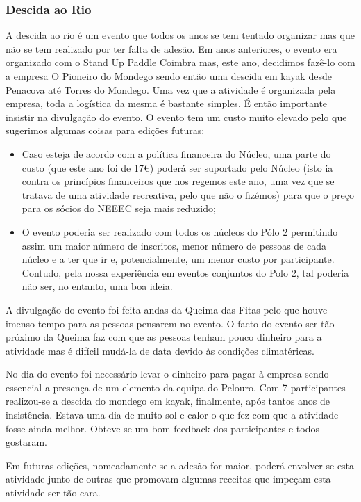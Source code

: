 
\subsubsection{Descida ao Rio}

A descida ao rio é um evento que todos os anos se tem tentado organizar mas que não se tem realizado por ter falta de adesão. Em anos anteriores, o evento era organizado com o Stand Up Paddle Coimbra mas, este ano, decidimos fazê-lo com a empresa O Pioneiro do Mondego sendo então uma descida em kayak desde Penacova até Torres do Mondego. Uma vez que a atividade é organizada pela empresa, toda a logística da mesma é bastante simples. É então importante insistir na divulgação do evento. O evento tem um custo muito elevado pelo que sugerimos algumas coisas para edições futuras:
\begin{itemize}
\item Caso esteja de acordo com a política financeira do Núcleo, uma parte do custo (que este ano foi de 17€) poderá ser suportado pelo Núcleo (isto ia contra os princípios financeiros que nos regemos este ano, uma vez que se tratava de uma atividade recreativa, pelo que não o fizémos) para que o preço para os sócios do NEEEC seja mais reduzido;
\item O evento poderia ser realizado com todos os núcleos do Pólo 2 permitindo assim um maior número de inscritos, menor número de pessoas de cada núcleo e a ter que ir e, potencialmente, um menor custo por participante. Contudo, pela nossa experiência em eventos conjuntos do Polo 2, tal poderia não ser, no entanto, uma boa ideia.
\end{itemize}

A divulgação do evento foi feita andas da Queima das Fitas pelo que houve imenso tempo para as pessoas pensarem no evento. O facto do evento ser tão próximo da Queima faz com que as pessoas tenham pouco dinheiro para a atividade mas é difícil mudá-la de data devido às condições climatéricas.

No dia do evento foi necessário levar o dinheiro para pagar à empresa sendo essencial a presença de um elemento da equipa do Pelouro. Com 7 participantes realizou-se a descida do mondego em kayak, finalmente, após tantos anos de insistência. Estava uma dia de muito sol e calor o que fez com que a atividade fosse ainda melhor. Obteve-se um bom feedback dos participantes e todos gostaram.

Em futuras edições, nomeadamente se a adesão for maior, poderá envolver-se esta atividade junto de outras que promovam algumas receitas que impeçam esta atividade ser tão cara.
